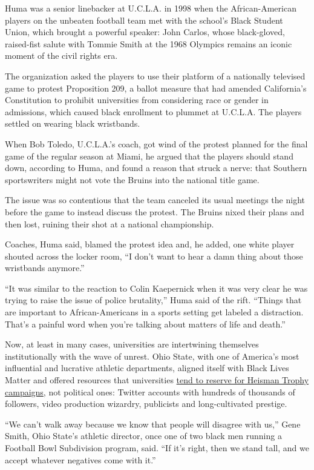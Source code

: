 Huma was a senior linebacker at U.C.L.A. in 1998 when the
African-American players on the unbeaten football team met with the
school's Black Student Union, which brought a powerful speaker: John
Carlos, whose black-gloved, raised-fist salute with Tommie Smith at the
1968 Olympics remains an iconic moment of the civil rights era.

The organization asked the players to use their platform of a nationally
televised game to protest Proposition 209, a ballot measure that had
amended California's Constitution to prohibit universities from
considering race or gender in admissions, which caused black enrollment
to plummet at U.C.L.A. The players settled on wearing black wristbands.

When Bob Toledo, U.C.L.A.'s coach, got wind of the protest planned for
the final game of the regular season at Miami, he argued that the
players should stand down, according to Huma, and found a reason that
struck a nerve: that Southern sportswriters might not vote the Bruins
into the national title game.

The issue was so contentious that the team canceled its usual meetings
the night before the game to instead discuss the protest. The Bruins
nixed their plans and then lost, ruining their shot at a national
championship.

Coaches, Huma said, blamed the protest idea and, he added, one white
player shouted across the locker room, ``I don't want to hear a damn
thing about those wristbands anymore.''

``It was similar to the reaction to Colin Kaepernick when it was very
clear he was trying to raise the issue of police brutality,'' Huma said
of the rift. ``Things that are important to African-Americans in a
sports setting get labeled a distraction. That's a painful word when
you're talking about matters of life and death.''

Now, at least in many cases, universities are intertwining themselves
institutionally with the wave of unrest. Ohio State, with one of
America's most influential and lucrative athletic departments, aligned
itself with Black Lives Matter and offered resources that universities
\href{https://www.nytimes.com/2019/10/24/sports/ncaafootball/heisman-trophy-wisconsin-jonathan-taylor.html}{tend
to reserve for Heisman Trophy campaigns}, not political ones: Twitter
accounts with hundreds of thousands of followers, video production
wizardry, publicists and long-cultivated prestige.

``We can't walk away because we know that people will disagree with
us,'' Gene Smith, Ohio State's athletic director, once one of two black
men running a Football Bowl Subdivision program, said. ``If it's right,
then we stand tall, and we accept whatever negatives come with it.''


